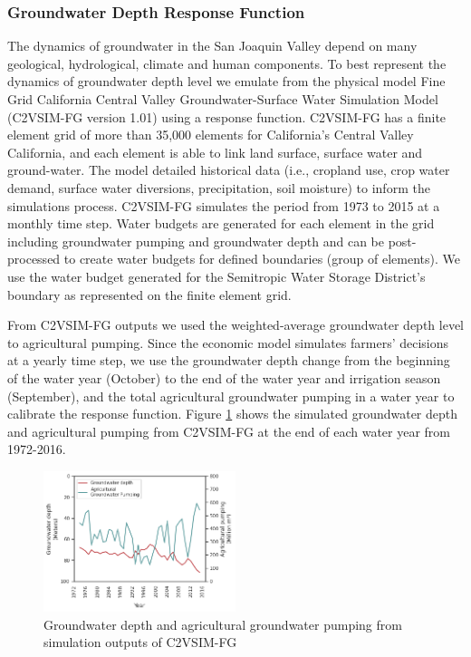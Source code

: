 \documentclass[a4paper,fleqn]{cas-sc}
\begin{document}
\subsubsection{Groundwater Depth Response Function}

The dynamics of groundwater in the San Joaquin Valley depend on many geological, hydrological, climate and human components. To best represent the dynamics of groundwater depth level we emulate from the physical model Fine Grid California Central Valley Groundwater-Surface Water Simulation Model (C2VSIM-FG version 1.01) \citep{dwr_c2vsimfg_2021} using a response function. C2VSIM-FG has a finite element grid of more than 35,000 elements for California’s Central Valley California, and each element is able to link land surface, surface water and ground-water. The model detailed historical data (i.e., cropland use, crop water demand, surface water diversions, precipitation, soil moisture) to inform the simulations process. C2VSIM-FG simulates the period from 1973 to 2015 at a monthly time step. Water budgets are generated for each element in the grid including groundwater pumping and groundwater depth and can be post-processed to create water budgets for defined boundaries (group of elements). We use the water budget generated for the Semitropic Water Storage District's boundary as represented on the finite element grid. 

From C2VSIM-FG outputs we used the weighted-average groundwater depth level to agricultural pumping. Since the economic model simulates farmers’ decisions at a yearly time step, we use the groundwater depth change from the beginning of the water year (October) to the end of the water year and irrigation season (September), and the total agricultural groundwater pumping in a water year to calibrate the response function. Figure \ref{fig:3} shows the simulated groundwater depth and agricultural pumping from C2VSIM-FG at the end of each water year from 1972-2016. 

\begin{figure}[ht]
    \centering
    \includegraphics[width=0.5\textwidth]{c2vsim_semitropic.png}
    \caption{Groundwater depth and agricultural groundwater pumping from simulation outputs of C2VSIM-FG \citep{dwr_c2vsimfg_2021}}
    \label{fig:3}
\end{figure}
\end{document}
